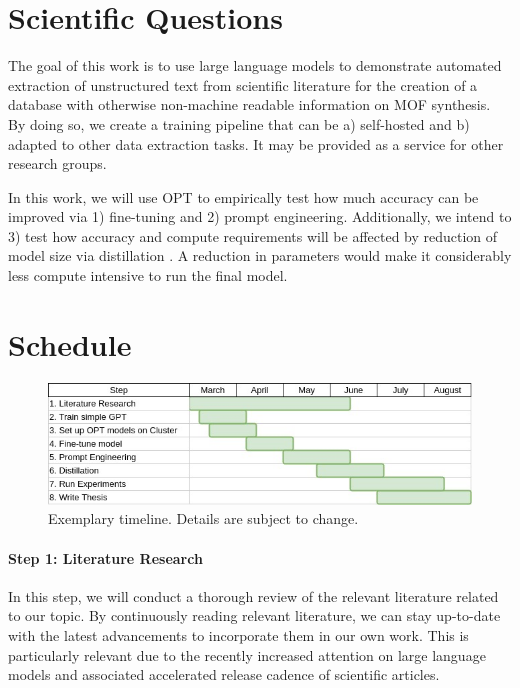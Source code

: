\documentclass[a4paper,11pt]{article}
\newcommand{\margtodo}                                 %
{\marginpar{\textbf{\textcolor{red}{ToDo}}}{}}
\newcommand{\todo}[1]
{{\textbf{\textcolor{red}{[\margtodo{}#1]}}}{}}   %
\begin{document}

\section{Scientific Questions}
The goal of this work is to use large language models to demonstrate automated
extraction of unstructured text from scientific literature for the creation of
a database with otherwise non-machine readable information on MOF synthesis. By
doing so, we create a training pipeline that can be a) self-hosted and b)
adapted to other data extraction tasks. It may be provided as a service for
other research groups.

In this work, we will use OPT \cite{zhang_opt_2022} to empirically test how
much accuracy can be improved via 1) fine-tuning and 2) prompt engineering.
Additionally, we intend to 3) test how accuracy and compute requirements will be
affected by reduction of model size via distillation \cite{sun_patient_2019}.
A reduction in parameters would make it considerably less compute intensive to
run the final model.


\section{Schedule}
\begin{figure}[ht!]
    \includegraphics[width=\textwidth]{img/thesis_gantt}
    \caption{Exemplary timeline. Details are subject to change.}
\end{figure}


\paragraph{Step 1: Literature Research}
In this step, we will conduct a thorough review of the relevant literature
related to our topic. By continuously reading relevant literature, we can
stay up-to-date with the latest advancements to incorporate them in our own
work. This is particularly relevant due to the recently increased attention
on large language models and associated accelerated release cadence of
scientific articles.
\end{document}
